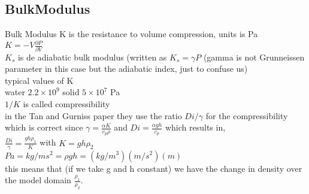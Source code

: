 \subsection{BulkModulus}

Bulk Modulus K is the resistance to volume compression, units is Pa \\
$K=-V\frac{\partial P}{\partial V}$ \\
$K_{s}$ is de adiabatic bulk modulus (written as $K_{s} = \gamma P$ (gamma is not Grunneissen parameter in this case but the adiabatic index, just to confuse us) \\
typical values of K \\
water $2.2\times 10^{9}$ solid $5 \times 10^{7}$ Pa \\
$1/K$ is called compressibility \\
in the Tan and Gurniss paper they use the ratio $Di/\gamma$ for the compressibility which is correct since
$\gamma = \frac{\alpha K}{c_{p} \rho}$ and $Di = \frac{\alpha g h}{c_{p}}$ which results in, \\
$\frac{Di}{\gamma} = \frac{g h \rho_{1}}{K}$ with $K = g h \rho_{2}$ \\
$Pa = kg/m s^{2} = \rho g h = (kg/m^{3}) (m/s^{2}) (m)$ \\
this means that (if we take g and h constant) we have the change in density over the model domain $\frac{\rho_{1}}{\rho_{2}}$.

